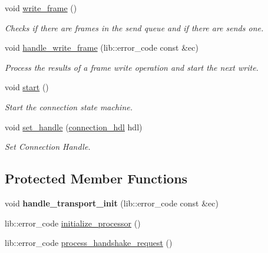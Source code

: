 \begin{DoxyCompactItemize}
\item 
void \mbox{\hyperlink{classwebsocketpp_1_1connection_a8d26a29e90d4847f3882c280112c6b60}{write\+\_\+frame}} ()
\begin{DoxyCompactList}\small\item\em Checks if there are frames in the send queue and if there are sends one. \end{DoxyCompactList}\item 
void \mbox{\hyperlink{classwebsocketpp_1_1connection_a867f94b82788e978ea116d50cf83d72e}{handle\+\_\+write\+\_\+frame}} (lib\+::error\+\_\+code const \&ec)
\begin{DoxyCompactList}\small\item\em Process the results of a frame write operation and start the next write. \end{DoxyCompactList}\item 
\mbox{\label{classwebsocketpp_1_1connection_a152530ff43396025175f85748d8ee708}} 
void \mbox{\hyperlink{classwebsocketpp_1_1connection_a152530ff43396025175f85748d8ee708}{start}} ()
\begin{DoxyCompactList}\small\item\em Start the connection state machine. \end{DoxyCompactList}\item 
void \mbox{\hyperlink{classwebsocketpp_1_1connection_af07f4fac45e1b64de7e0d12ece0d23a8}{set\+\_\+handle}} (\mbox{\hyperlink{namespacewebsocketpp_a6b3d26a10ee7229b84b776786332631d}{connection\+\_\+hdl}} hdl)
\begin{DoxyCompactList}\small\item\em Set Connection Handle. \end{DoxyCompactList}\end{DoxyCompactItemize}
\subsection*{Protected Member Functions}
\begin{DoxyCompactItemize}
\item 
\mbox{\label{classwebsocketpp_1_1connection_ad42c5982a35b82c9009971722943b1e0}} 
void {\bfseries handle\+\_\+transport\+\_\+init} (lib\+::error\+\_\+code const \&ec)
\item 
lib\+::error\+\_\+code \mbox{\hyperlink{classwebsocketpp_1_1connection_ac1c576bd4dfebac977eade9ac637a432}{initialize\+\_\+processor}} ()
\item 
lib\+::error\+\_\+code \mbox{\hyperlink{classwebsocketpp_1_1connection_a569483c7dcf542f500f6e9f49d803010}{process\+\_\+handshake\+\_\+request}} ()
\end{DoxyCompactItemize}


